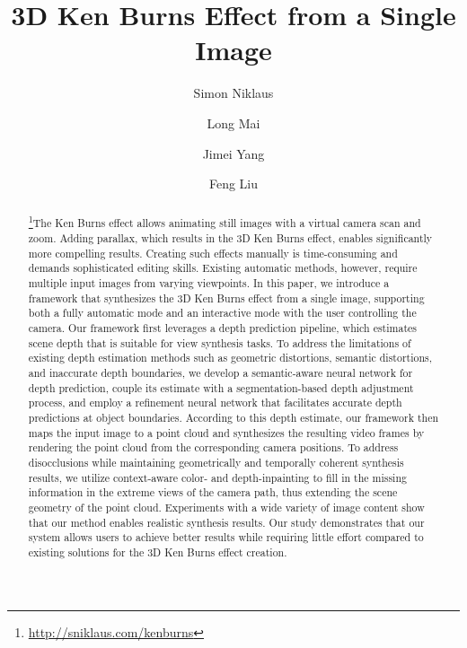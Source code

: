 \documentclass[acmtog,authorversion]{acmart}
\begin{document}
\title{3D Ken Burns Effect from a Single Image}

\author{Simon Niklaus}

\author{Long Mai}

\author{Jimei Yang}

\author{Feng Liu}

\renewcommand{\shortauthors}{Niklaus, Mai, Yang, and Liu}

\begin{abstract}

    {\let\thefootnote\relax\footnote{\url{http://sniklaus.com/kenburns}}\setcounter{footnote}{0}}The Ken Burns effect allows animating still images with a virtual camera scan and zoom. Adding parallax, which results in the 3D Ken Burns effect, enables significantly more compelling results. Creating such effects manually is time-consuming and demands sophisticated editing skills. Existing automatic methods, however, require multiple input images from varying viewpoints. In this paper, we introduce a framework that synthesizes the 3D Ken Burns effect from a single image, supporting both a fully automatic mode and an interactive mode with the user controlling the camera. Our framework first leverages a depth prediction pipeline, which estimates scene depth that is suitable for view synthesis tasks. To address the limitations of existing depth estimation methods such as geometric distortions, semantic distortions, and inaccurate depth boundaries, we develop a semantic-aware neural network for depth prediction, couple its estimate with a segmentation-based depth adjustment process, and employ a refinement neural network that facilitates accurate depth predictions at object boundaries. According to this depth estimate, our framework then maps the input image to a point cloud and synthesizes the resulting video frames by rendering the point cloud from the corresponding camera positions. To address disocclusions while maintaining geometrically and temporally coherent synthesis results, we utilize context-aware color- and depth-inpainting to fill in the missing information in the extreme views of the camera path, thus extending the scene geometry of the point cloud. Experiments with a wide variety of image content show that our method enables realistic synthesis results. Our study demonstrates that our system allows users to achieve better results while requiring little effort compared to existing solutions for the 3D Ken Burns effect creation.\vspace{0.5cm}

\end{abstract}
\end{document}
